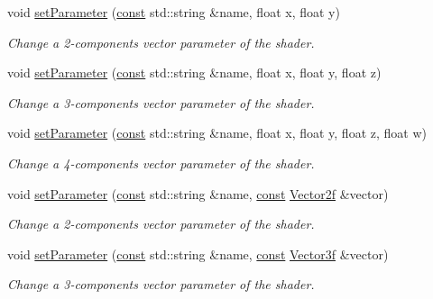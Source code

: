 \begin{DoxyCompactItemize}
void \hyperlink{classsf_1_1_shader_ab8d379f40810b8e3eadebee81aedd231}{set\-Parameter} (\hyperlink{term__entry_8h_a57bd63ce7f9a353488880e3de6692d5a}{const} std\-::string \&name, float x, float y)
\begin{DoxyCompactList}\small\item\em Change a 2-\/components vector parameter of the shader. \end{DoxyCompactList}\item 
void \hyperlink{classsf_1_1_shader_a7e36e044d6b8adca8339f40c5a4b1801}{set\-Parameter} (\hyperlink{term__entry_8h_a57bd63ce7f9a353488880e3de6692d5a}{const} std\-::string \&name, float x, float y, float z)
\begin{DoxyCompactList}\small\item\em Change a 3-\/components vector parameter of the shader. \end{DoxyCompactList}\item 
void \hyperlink{classsf_1_1_shader_aeb468f1bc2d26750b96b74f1e19027fb}{set\-Parameter} (\hyperlink{term__entry_8h_a57bd63ce7f9a353488880e3de6692d5a}{const} std\-::string \&name, float x, float y, float z, float w)
\begin{DoxyCompactList}\small\item\em Change a 4-\/components vector parameter of the shader. \end{DoxyCompactList}\item 
void \hyperlink{classsf_1_1_shader_a3ac473ece2c6fa26dc5032c07fd7288e}{set\-Parameter} (\hyperlink{term__entry_8h_a57bd63ce7f9a353488880e3de6692d5a}{const} std\-::string \&name, \hyperlink{term__entry_8h_a57bd63ce7f9a353488880e3de6692d5a}{const} \hyperlink{namespacesf_a80cea3c46537294fd1d8d428566ad8b2}{Vector2f} \&vector)
\begin{DoxyCompactList}\small\item\em Change a 2-\/components vector parameter of the shader. \end{DoxyCompactList}\item 
void \hyperlink{classsf_1_1_shader_a87d4a0c6dc70ae68aecc0dda3f343c07}{set\-Parameter} (\hyperlink{term__entry_8h_a57bd63ce7f9a353488880e3de6692d5a}{const} std\-::string \&name, \hyperlink{term__entry_8h_a57bd63ce7f9a353488880e3de6692d5a}{const} \hyperlink{namespacesf_a36e44d9e6d8f649703698ec9d24ac052}{Vector3f} \&vector)
\begin{DoxyCompactList}\small\item\em Change a 3-\/components vector parameter of the shader. \end{DoxyCompactList}\item 

\end{DoxyCompactItemize}
